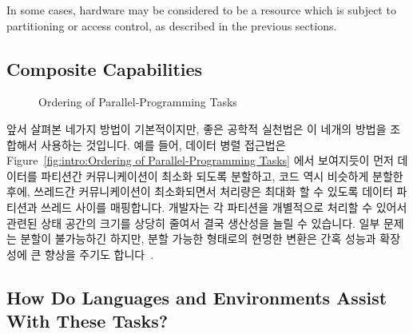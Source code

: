 In some cases, hardware may be considered to be a resource which
is subject to partitioning or access control, as described in
the previous sections.
\fi

\subsection{Composite Capabilities}
\label{sec:Composite Capabilities}

\begin{figure}[tb]
\centering
{}
\caption{Ordering of Parallel-Programming Tasks}
\label{fig:intro:Ordering of Parallel-Programming Tasks}
\end{figure}

앞서 살펴본 네가지 방법이 기본적이지만, 좋은 공학적 실천법은 이 네개의 방법을
조합해서 사용하는 것입니다.
예를 들어, 데이터 병렬 접근법은 Figure~\ref{fig:intro:Ordering of
Parallel-Programming Tasks} 에서 보여지듯이 먼저 데이터를 파티션간
커뮤니케이션이 최소화 되도록 분할하고, 코드 역시 비슷하게 분할한 후에, 쓰레드간
커뮤니케이션이 최소화되면서 처리량은 최대화 할 수 있도록 데이터 파티션과 쓰레드
사이를 매핑합니다.
개발자는 각 파티션을 개별적으로 처리할 수 있어서 관련된 상태 공간의 크기를
상당히 줄여서 결국 생산성을 늘릴 수 있습니다.
일부 문제는 분할이 불가능하긴 하지만, 분할 가능한 형태로의 현명한 변환은 간혹
성능과 확장성에 큰 향상을 주기도 합니다~\cite{PanagiotisMetaxas1999PDCS}.

\subsection{How Do Languages and Environments Assist With These Tasks?}
\label{sec:intro:How Do Languages and Environments Assist With These Tasks?}

